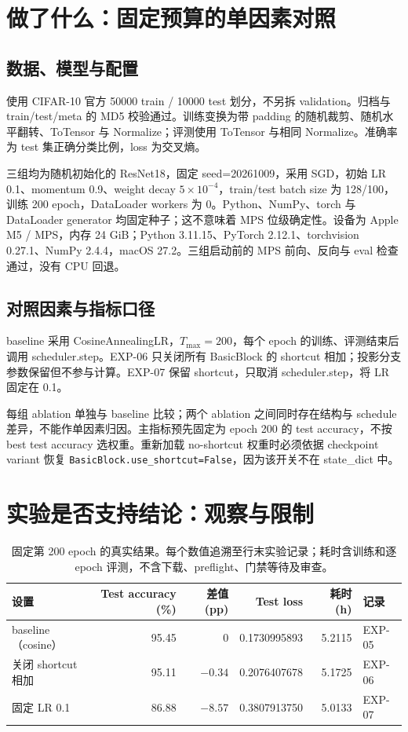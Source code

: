\documentclass[conference]{IEEEtran}
\begin{document}
\section{做了什么：固定预算的单因素对照}
\subsection{数据、模型与配置}
使用 CIFAR-10 官方 50000 train / 10000 test 划分，不另拆 validation。归档与 train/test/meta 的 MD5 校验通过\cite{exp08}。训练变换为带 padding 的随机裁剪、随机水平翻转、ToTensor 与 Normalize；评测使用 ToTensor 与相同 Normalize。准确率为 test 集正确分类比例，loss 为交叉熵。

三组均为随机初始化的 ResNet18，固定 seed=20261009，采用 SGD，初始 LR 0.1、momentum 0.9、weight decay $5\times10^{-4}$，train/test batch size 为 128/100，训练 200 epoch，DataLoader workers 为 0\cite{exp05,exp06,exp07}。Python、NumPy、torch 与 DataLoader generator 均固定种子；这不意味着 MPS 位级确定性。设备为 Apple M5 / MPS，内存 24 GiB；Python 3.11.15、PyTorch 2.12.1、torchvision 0.27.1、NumPy 2.4.4，macOS 27.2。三组启动前的 MPS 前向、反向与 eval 检查通过，没有 CPU 回退\cite{exp08}。

\subsection{对照因素与指标口径}
baseline 采用 CosineAnnealingLR，$T_{\max}=200$，每个 epoch 的训练、评测结束后调用 scheduler.step。EXP-06 只关闭所有 BasicBlock 的 shortcut 相加；投影分支参数保留但不参与计算。EXP-07 保留 shortcut，只取消 scheduler.step，将 LR 固定在 0.1\cite{exp05,exp06,exp07}。

每组 ablation 单独与 baseline 比较；两个 ablation 之间同时存在结构与 schedule 差异，不能作单因素归因。主指标预先固定为 epoch 200 的 test accuracy，不按 best test accuracy 选权重。重新加载 no-shortcut 权重时必须依据 checkpoint variant 恢复 \texttt{BasicBlock.use\_shortcut=False}，因为该开关不在 state\_dict 中\cite{exp06}。

\section{实验是否支持结论：观察与限制}
\begin{table}[t]
\centering
\caption{固定第 200 epoch 的真实结果。每个数值追溯至行末实验记录；耗时含训练和逐 epoch 评测，不含下载、preflight、门禁等待及审查。}
\label{tab:results}
\begin{tabular}{@{}lrrrrl@{}}
\toprule
设置 & Test accuracy (\%) & 差值 (pp) & Test loss & 耗时 (h) & 记录 \\
\midrule
baseline（cosine） & 95.45 & 0 & 0.1730995893 & 5.2115 & EXP-05 \\
关闭 shortcut 相加 & 95.11 & $-0.34$ & 0.2076407678 & 5.1725 & EXP-06 \\
固定 LR 0.1 & 86.88 & $-8.57$ & 0.3807913750 & 5.0133 & EXP-07 \\
\bottomrule
\end{tabular}
\end{table}
\end{document}
